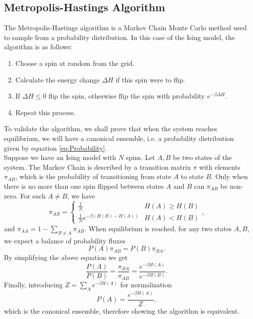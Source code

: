 \documentclass[11pt]{article}
\begin{document}
	\subsection{Metropolis-Hastings Algorithm}
	\label{metropolis_algorithm}
	
	The Metropolis-Hastings algorithm is a Markov Chain Monte Carlo method used to sample from a probability distribution. In this case of the Ising model, the algorithm is as follows:
	\begin{enumerate}
		\item Choose a spin at random from the grid.
		\item Calculate the energy change $\Delta H$ if this spin were to flip.
		\item If $\Delta H \leq 0$ flip the spin, otherwise flip the spin with probability $e^{-\beta\Delta H}$.
		\item Repeat this process.
	\end{enumerate}

	To validate the algorithm, we shall prove that when the system reaches equilibrium, we will have a canonical ensemble, i.e. a probability distribution given by equation \eqref{eq:Probability}.\\
	
	Suppose we have an Ising model with $N$ spins. Let $A, B$ be two states of the system. The Markov Chain is described by a transition matrix $\pi$ with elements $\pi_{AB}$, which is the probability of transitioning from state $A$ to state $B$. Only when there is no more than one spin flipped between states $A$ and $B$ can $\pi_{AB}$ be non-zero. For such $A \neq B$, we have
	\begin{equation}
		\pi_{AB} = \begin{cases}
			\frac{1}{N} & H(A) \geq H(B) \\
			\frac{1}{N} e^{-\beta(H(B) - H(A))} & H(A) < H(B)
		\end{cases},
	\end{equation}
	and $\pi_{AA} = 1 - \sum_{B \neq A} \pi_{AB}$. When equilibrium is reached, for any two states $A, B$, we expect a balance of probability fluxes
	\begin{equation}
		P(A) \pi_{AB} = P(B) \pi_{BA}.
	\end{equation}
	By simplifying the above equation we get
	\begin{equation}
		\frac{P(A)}{P(B)} = \frac{\pi_{BA}}{\pi_{AB}} = \frac{e^{-\beta H(A)}}{e^{-\beta H(B)}}.
	\end{equation}
	Finally, introducing $\displaystyle Z = \sum_A e^{-\beta H(A)}$ for normalization
	\begin{equation}
		P(A) = \frac{e^{-\beta H(A)}}{Z},
	\end{equation}
	which is the canonical ensemble, therefore showing the algorithm is equivalent.
\end{document}
